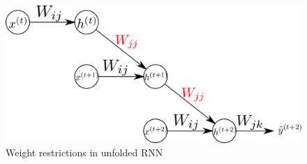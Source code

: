 \begin{figure}[bth]
  \centering
  \includegraphics[width=.95\linewidth]
  {gfx/bptt-unfolded-rnn-weight-restrictions}
  \caption{Weight restrictions in unfolded RNN}
  \label{fig:bptt-unfolded-rnn-weight-restrictions}
\end{figure}




